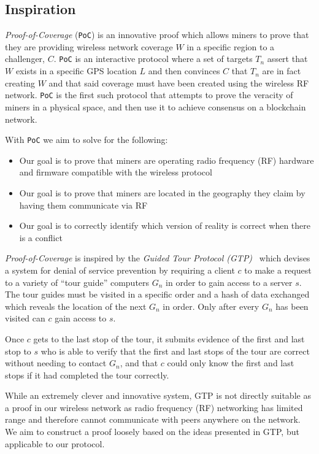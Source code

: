 \documentclass[UTF8, 10pt, nonatbib, nocopyrightspace, reprint]{sigplanconf}
\begin{document}
\subsection{Inspiration}

\emph{Proof-of-Coverage} (\verb|PoC|) is an innovative proof which allows miners to prove that they are providing wireless network coverage $W$ in a specific region to a challenger, $C$. \verb|PoC| is an interactive protocol where a set of targets $T_n$ assert that $W$ exists in a specific GPS location $L$ and then convinces $C$ that $T_n$ are in fact creating $W$ and that said coverage must have been created using the wireless RF network. \verb|PoC| is the first such protocol that attempts to prove the veracity of miners in a physical space, and then use it to achieve consensus on a blockchain network.

With \verb|PoC| we aim to solve for the following:

\begin{itemize}
    \item Our goal is to prove that miners are operating radio frequency (RF) hardware and firmware compatible with the wireless protocol
    \item Our goal is to prove that miners are located in the geography they claim by having them communicate via RF
    \item Our goal is to correctly identify which version of reality is correct when there is a conflict
\end{itemize}

\emph{Proof-of-Coverage} is inspired by the \emph{Guided Tour Protocol (GTP)}~\cite{gtp} which devises a system for denial of service prevention by requiring a client $c$ to make a request to a variety of ``tour guide'' computers $G_n$ in order to gain access to a server $s$. The tour guides must be visited in a specific order and a hash of data exchanged which reveals the location of the next $G_n$ in order. Only after every $G_n$ has been visited can $c$ gain access to $s$.

Once $c$ gets to the last stop of the tour, it submits evidence of the first and last stop to $s$ who is able to verify that the first and last stops of the tour are correct without needing to contact $G_n$, and that $c$ could only know the first and last stops if it had completed the tour correctly.

While an extremely clever and innovative system, GTP is not directly suitable as a proof in our wireless network as radio frequency (RF) networking has limited range and therefore cannot communicate with peers anywhere on the network. We aim to construct a proof loosely based on the ideas presented in GTP, but applicable to our protocol.
\end{document}
